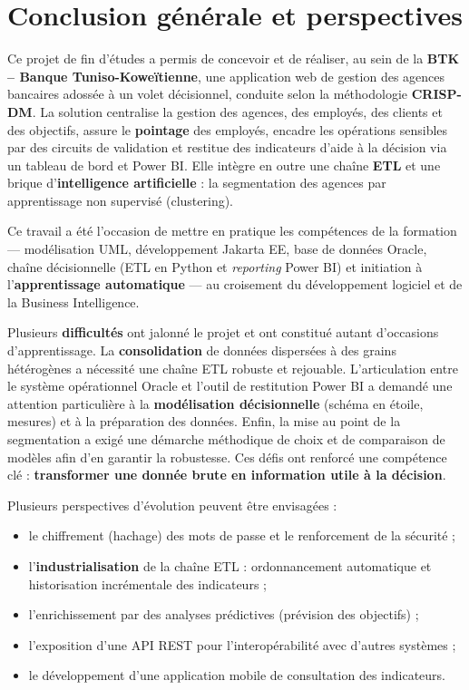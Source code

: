 \chapter*{Conclusion générale et perspectives}

Ce projet de fin d'études a permis de concevoir et de réaliser, au sein de la
\textbf{BTK -- Banque Tuniso-Koweïtienne}, une application web de gestion des
agences bancaires adossée à un volet décisionnel, conduite selon la méthodologie
\textbf{CRISP-DM}. La solution centralise la gestion des agences, des employés, des
clients et des objectifs, assure le \textbf{pointage} des employés, encadre les
opérations sensibles par des circuits de validation et restitue des indicateurs
d'aide à la décision via un tableau de bord et Power BI. Elle intègre en outre une
chaîne \textbf{ETL} et une brique d'\textbf{intelligence artificielle} : la
segmentation des agences par apprentissage non supervisé (clustering).

Ce travail a été l'occasion de mettre en pratique les compétences de la formation
--- modélisation UML, développement Jakarta EE, base de données Oracle, chaîne
décisionnelle (ETL en Python et \emph{reporting} Power BI) et initiation à
l'\textbf{apprentissage automatique} --- au croisement du développement logiciel
et de la Business Intelligence.

Plusieurs \textbf{difficultés} ont jalonné le projet et ont constitué autant
d'occasions d'apprentissage. La \textbf{consolidation} de données dispersées à des
grains hétérogènes a nécessité une chaîne ETL robuste et rejouable. L'articulation
entre le système opérationnel Oracle et l'outil de restitution Power BI a demandé
une attention particulière à la \textbf{modélisation décisionnelle} (schéma en
étoile, mesures) et à la préparation des données. Enfin, la mise au point de la
segmentation a exigé une démarche méthodique de choix et de comparaison de modèles
afin d'en garantir la robustesse. Ces défis ont renforcé une compétence clé :
\textbf{transformer une donnée brute en information utile à la décision}.

Plusieurs perspectives d'évolution peuvent être envisagées :
\begin{itemize}[noitemsep]
  \item le chiffrement (hachage) des mots de passe et le renforcement de la
        sécurité ;
  \item l'\textbf{industrialisation} de la chaîne ETL : ordonnancement automatique
        et historisation incrémentale des indicateurs ;
  \item l'enrichissement par des analyses prédictives (prévision des objectifs) ;
  \item l'exposition d'une API REST pour l'interopérabilité avec d'autres
        systèmes ;
  \item le développement d'une application mobile de consultation des indicateurs.
\end{itemize}
